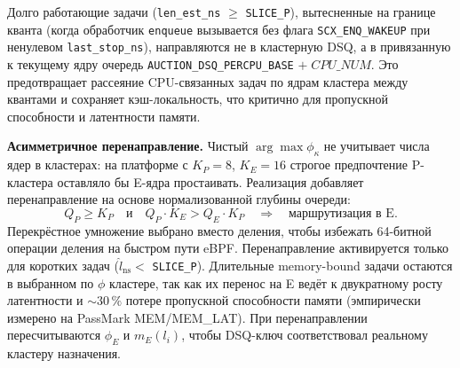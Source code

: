 \documentclass[14pt, oneside]{extbook}
\begin{document}
        Долго работающие задачи (\texttt{len\_est\_ns}
        $\geq$ \texttt{SLICE\_P}), вытесненные на границе
        кванта (когда обработчик \texttt{enqueue} вызывается
        без флага \texttt{SCX\_ENQ\_WAKEUP} при ненулевом
        \texttt{last\_stop\_ns}), направляются не в
        кластерную DSQ, а в привязанную к текущему ядру
        очередь \texttt{AUCTION\_\allowbreak DSQ\_\allowbreak PERCPU\_BASE}
        $+\;\mathit{CPU\_NUM}$. Это предотвращает рассеяние
        CPU-связанных задач по ядрам кластера между
        квантами и сохраняет кэш-локальность, что критично
        для пропускной способности и латентности памяти.

        \textbf{Асимметричное перенаправление.}
        Чистый $\arg\max\phi_\kappa$ не учитывает числа ядер
        в кластерах: на платформе с $K_P = 8$, $K_E = 16$
        строгое предпочтение P-кластера оставляло бы E-ядра
        простаивать. Реализация добавляет перенаправление
        на основе нормализованной глубины очереди:
        \[
                Q_P \geq K_P \quad \text{и} \quad
                Q_P \cdot K_E > Q_E \cdot K_P
                \quad\Longrightarrow\quad
                \text{маршрутизация в E.}
        \]
        Перекрёстное умножение выбрано вместо деления, чтобы
        избежать 64-битной операции деления на быстром пути
        eBPF. Перенаправление активируется только для коротких
        задач ($\hat l_{\mathrm{ns}} <$ \texttt{SLICE\_P}).
        Длительные memory-bound задачи остаются в выбранном
        по $\phi$ кластере, так как их перенос на E ведёт к
        двукратному росту латентности и $\sim 30\,\%$ потере
        пропускной способности памяти (эмпирически измерено
        на PassMark MEM/MEM\_LAT). При перенаправлении
        пересчитываются $\phi_E$ и $m_E(l_i)$, чтобы DSQ-ключ
        соответствовал реальному кластеру назначения.
\end{document}
